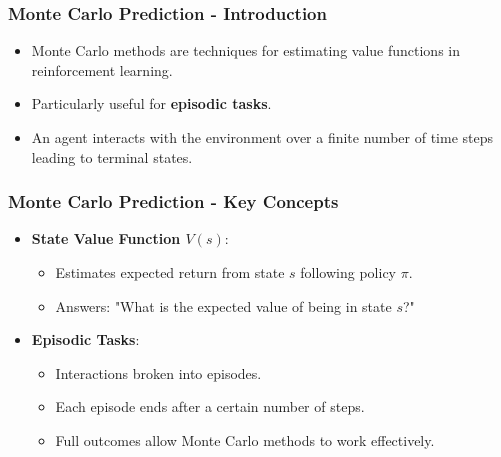 \documentclass[aspectratio=169]{beamer}
\begin{document}
\begin{frame}[fragile]
    \frametitle{Monte Carlo Prediction - Introduction}
    \begin{itemize}
        \item Monte Carlo methods are techniques for estimating value functions in reinforcement learning.
        \item Particularly useful for \textbf{episodic tasks}.
        \item An agent interacts with the environment over a finite number of time steps leading to terminal states.
    \end{itemize}
\end{frame}

\begin{frame}[fragile]
    \frametitle{Monte Carlo Prediction - Key Concepts}
    \begin{itemize}
        \item \textbf{State Value Function \(V(s)\)}:
        \begin{itemize}
            \item Estimates expected return from state \(s\) following policy \(\pi\).
            \item Answers: "What is the expected value of being in state \(s\)?"
        \end{itemize}
        
        \item \textbf{Episodic Tasks}:
        \begin{itemize}
            \item Interactions broken into episodes.
            \item Each episode ends after a certain number of steps.
            \item Full outcomes allow Monte Carlo methods to work effectively.
        \end{itemize}
    \end{itemize}
\end{frame}
\end{document}
